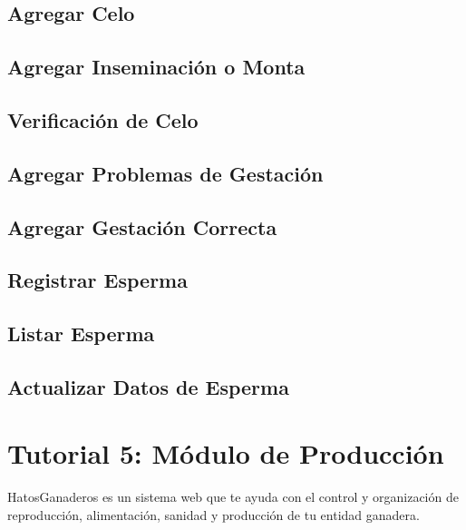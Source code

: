 \documentclass[letterpaper,10pt,english]{sphinxmanual}
\begin{document}
\subsection{Agregar Celo}
\label{Tutorial 4: M_xf3dulo de Reproducci_xf3n:agregar-celo}

\subsection{Agregar Inseminación o Monta}
\label{Tutorial 4: M_xf3dulo de Reproducci_xf3n:agregar-inseminacion-o-monta}

\subsection{Verificación de Celo}
\label{Tutorial 4: M_xf3dulo de Reproducci_xf3n:verificacion-de-celo}

\subsection{Agregar Problemas de Gestación}
\label{Tutorial 4: M_xf3dulo de Reproducci_xf3n:agregar-problemas-de-gestacion}

\subsection{Agregar Gestación Correcta}
\label{Tutorial 4: M_xf3dulo de Reproducci_xf3n:agregar-gestacion-correcta}

\subsection{Registrar Esperma}
\label{Tutorial 4: M_xf3dulo de Reproducci_xf3n:registrar-esperma}

\subsection{Listar Esperma}
\label{Tutorial 4: M_xf3dulo de Reproducci_xf3n:listar-esperma}

\subsection{Actualizar Datos de Esperma}
\label{Tutorial 4: M_xf3dulo de Reproducci_xf3n:actualizar-datos-de-esperma}

\section{Tutorial 5: Módulo de Producción}
\label{Tutorial 5: M_xf3dulo de Producci_xf3n::doc}\label{Tutorial 5: M_xf3dulo de Producci_xf3n:tutorial-5-modulo-de-produccion}
HatosGanaderos es un sistema web que te ayuda con el control y organización de reproducción, alimentación, sanidad y producción de tu entidad ganadera.
\end{document}
